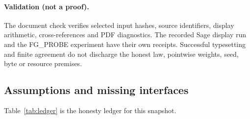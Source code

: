 \paragraph{Validation (not a proof).}
The document check verifies selected input hashes, source identifiers,
display arithmetic, cross-references and PDF diagnostics. The recorded
Sage display run and the FG\_PROBE experiment have their own receipts.
Successful typesetting and finite agreement do not discharge the honest
law, pointwise weights, seed, byte or resource premises.

\subsection{Assumptions and missing interfaces}
Table~\ref{tab:ledger} is the honesty ledger for this snapshot.
